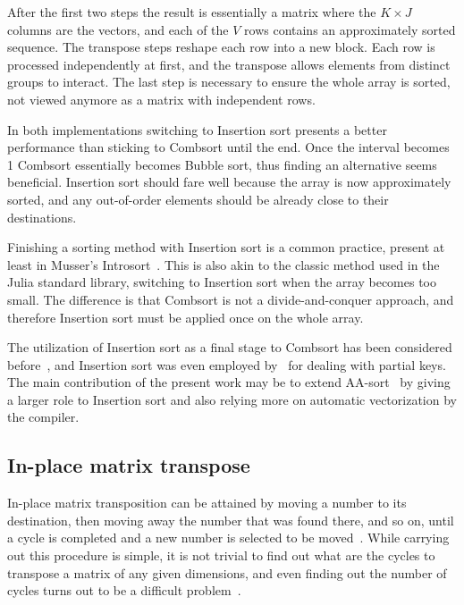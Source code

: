\documentclass{juliacon}
\begin{document}
After the first two steps the result is essentially a matrix where the $K\times J$ columns are the vectors, and each of the $V$ rows contains an approximately sorted sequence. The transpose steps reshape each row into a new block. Each row is processed independently at first, and the transpose allows elements from distinct groups to interact. The last step is necessary to ensure the whole array is sorted, not viewed anymore as a matrix with independent rows.

In both implementations switching to Insertion sort presents a better performance than sticking to Combsort until the end. Once the interval becomes 1 Combsort essentially becomes Bubble sort, thus finding an alternative seems beneficial. Insertion sort should fare well because the array is now approximately sorted, and any out-of-order elements should be already close to their destinations.

Finishing a sorting method with Insertion sort is a common practice, present at least in Musser's Introsort~\cite{musser1997introspective}. This is also akin to the classic method used in the Julia standard library, switching to Insertion sort when the array becomes too small. The difference is that Combsort is not a divide-and-conquer approach, and therefore Insertion sort must be applied once on the whole array.

The utilization of Insertion sort as a final stage to Combsort has been considered before~\cite{combwiki,INCERPI198737}, and Insertion sort was even employed by~\cite{DBLP:journals/pvldb/InoueT15} for dealing with partial keys. The main contribution of the present work may be to extend AA-sort~\cite{DBLP:conf/IEEEpact/InoueMKN07,DBLP:journals/pvldb/InoueT15} by giving a larger role to Insertion sort and also relying more on automatic vectorization by the compiler.

\subsection{In-place matrix transpose}
%
In-place matrix transposition can be attained by moving a number to its destination, then moving away the number that was found there, and so on, until a cycle is completed and a new number is selected to be moved~\cite{10.1093/comjnl/2.1.47}. While carrying out this procedure is simple, it is not trivial to find out what are the cycles to transpose a matrix of any given dimensions, and even finding out the number of cycles turns out to be a difficult problem~\cite[1.3.3-12]{DBLP:books/lib/Knuth97}.
\end{document}
